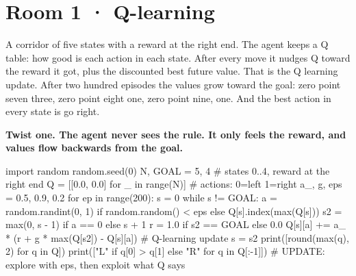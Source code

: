 \documentclass[11pt,a4paper]{report}
\begin{document}
\section*{Room 1 · Q-learning}
A corridor of five states with a reward at the right end. The agent keeps a Q table: how good is each action in each state. After every move it nudges Q toward the reward it got, plus the discounted best future value. That is the Q learning update. After two hundred episodes the values grow toward the goal: zero point seven three, zero point eight one, zero point nine, one. And the best action in every state is go right.
\begin{tcolorbox}[colback=yellow!12,colframe=orange!70!black,boxrule=0.4pt,left=4pt,right=4pt,top=2pt,bottom=2pt]\textbf{Twist one. The agent never sees the rule. It only feels the reward, and values flow backwards from the goal.}\end{tcolorbox}
\begin{Code}
import random
random.seed(0)
N, GOAL = 5, 4                              # states 0..4, reward at the right end
Q = [[0.0, 0.0] for _ in range(N)]          # actions: 0=left 1=right
a_, g, eps = 0.5, 0.9, 0.2
for ep in range(200):
    s = 0
    while s != GOAL:
        a = random.randint(0, 1) if random.random() < eps else Q[s].index(max(Q[s]))
        s2 = max(0, s - 1) if a == 0 else s + 1
        r = 1.0 if s2 == GOAL else 0.0
        Q[s][a] += a_ * (r + g * max(Q[s2]) - Q[s][a])   # Q-learning update
        s = s2
print([round(max(q), 2) for q in Q])
print(["L" if q[0] > q[1] else "R" for q in Q[:-1]])
# UPDATE: explore with eps, then exploit what Q says
\end{Code}
\begin{Out}
[0.73, 0.81, 0.9, 1.0, 0.0]
['R', 'R', 'R', 'R']
\end{Out}
\end{document}

